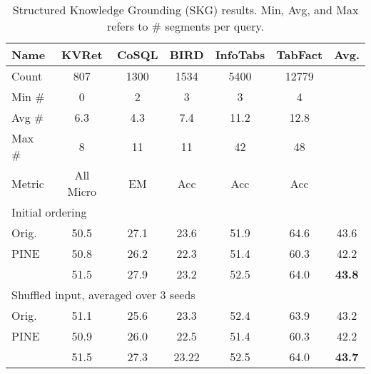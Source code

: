 \begin{table}[t]
\centering
\resizebox{\linewidth}{!}
{
\begin{tabular}{@{}lcccccc@{}}
\toprule
\multicolumn{1}{l|}{Name}   & KVRet     & CoSQL  & BIRD   & InfoTabs & TabFact                     & Avg.            \\ \midrule
\multicolumn{1}{l|}{Count} & 807         & 1300    & 1534     & 5400        & 12779                          &                 \\
\multicolumn{1}{l|}{Min \#} & 0         & 2      & 3      & 3        & 4                           &                 \\
\multicolumn{1}{l|}{Avg \#} & 6.3       & 4.3    & 7.4    & 11.2     & 12.8                        &                 \\
\multicolumn{1}{l|}{Max \#} & 8         & 11     & 11     & 42       & 48                          &                 \\
\multicolumn{1}{l|}{Metric} & All Micro & EM     & Acc    & Acc      & Acc                         &                 \\ \midrule
\multicolumn{7}{l}{Initial ordering}                                                                                 \\ \midrule
\multicolumn{1}{l|}{Orig.}   & 50.5    & 27.1 & 23.6 & 51.9   & \multicolumn{1}{c|}{64.6} & 43.6          \\
\multicolumn{1}{l|}{PINE}   & 50.8    & 26.2 & 22.3 & 51.4   & \multicolumn{1}{c|}{60.3} & 42.2          \\
\multicolumn{1}{l|}{\ours{}}   & 51.5    & 27.9 & 23.2 & 52.5   & \multicolumn{1}{c|}{64.0} & \textbf{43.8} \\ \midrule
\multicolumn{7}{l}{Shuffled input, averaged over 3 seeds}                                                      \\ \midrule
\multicolumn{1}{l|}{Orig.}   & 51.1    & 25.6 & 23.3 & 52.4   & \multicolumn{1}{c|}{63.9} & 43.2          \\
\multicolumn{1}{l|}{PINE}   & 50.9    & 26.0 & 22.5 & 51.4   & \multicolumn{1}{c|}{60.3} & 42.2          \\
\multicolumn{1}{l|}{\ours{}}   & 51.5    & 27.3 & 23.22 & 52.5   & \multicolumn{1}{c|}{64.0} & \textbf{43.7} \\ \bottomrule
\end{tabular}
}
\caption{Structured Knowledge Grounding (SKG) results. Min, Avg, and Max refers to \# segments per query.}
\label{table/structlm_new}

\end{table}
